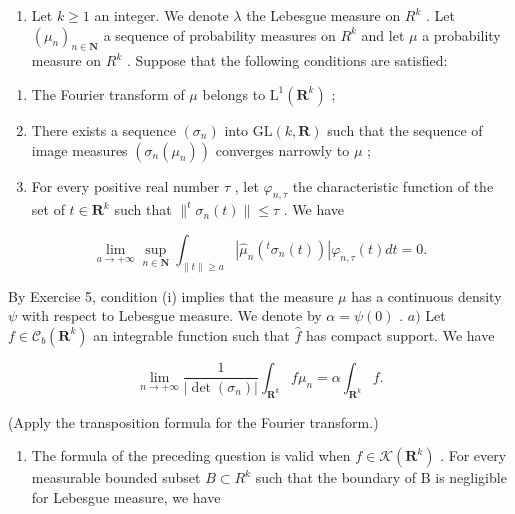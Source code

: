 \begin{enumerate}
\def\labelenumi{\arabic{enumi})}
\setcounter{enumi}{42}
\tightlist
\item
  Let \(k \geqslant 1\) an integer. We denote \(\lambda\) the Lebesgue measure on \(R^{k}\) . Let \((\mu_{n})_{n \in \mathbf{N}}\) a sequence of probability measures on \(R^{k}\) and let \(\mu\) a probability measure on \(R^{k}\) . Suppose that the following conditions are satisfied:
\end{enumerate}

\begin{enumerate}
\def\labelenumi{(\roman{enumi})}
\item
  The Fourier transform of \(\mu\) belongs to \(\mathrm{L}^1 (\mathbf{R}^k)\) ;
\item
  There exists a sequence \((\sigma_{n})\) into \(\mathrm{GL}(k,\mathbf{R})\) such that the sequence of image measures \((\sigma_{n}(\mu_{n}))\) converges narrowly to \(\mu\) ;
\item
  For every positive real number \(\tau\) , let \(\varphi_{n,\tau}\) the characteristic function of the set of \(t \in \mathbf{R}^k\) such that \(\|^{t} \sigma_{n}(t) \| \leqslant \tau\) . We have
\end{enumerate}

\[
\lim _ {a \to + \infty} \sup _ {n \in \mathbf {N}} \int_ {\| t \| \geqslant a} | \widehat {\mu} _ {n} (^ {t} \sigma_ {n} (t)) | \varphi_ {n, \tau} (t) d t = 0.
\]

By Exercise 5, condition (i) implies that the measure \(\mu\) has a continuous density \(\psi\) with respect to Lebesgue measure. We denote by \(\alpha = \psi(0)\) . \(a)\) Let \(f \in \mathcal{C}_b(\mathbf{R}^k)\) an integrable function such that \(\widehat{f}\) has compact support. We have

\[
\lim _ {n \to + \infty} \frac {1}{| \det (\sigma_ {n}) |} \int_ {\mathbf {R} ^ {k}} f \mu_ {n} = \alpha \int_ {\mathbf {R} ^ {k}} f.
\]

(Apply the transposition formula for the Fourier transform.)

\begin{enumerate}
\def\labelenumi{\alph{enumi})}
\setcounter{enumi}{1}
\tightlist
\item
  The formula of the preceding question is valid when \(f \in \mathcal{K}(\mathbf{R}^{k})\) . For every measurable bounded subset \(B \subset R^{k}\) such that the boundary of B is negligible for Lebesgue measure, we have
\end{enumerate}

